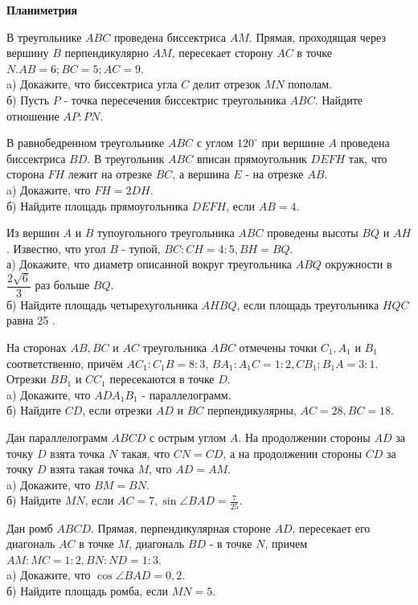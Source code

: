 \centerline{\bf \Huge Планиметрия}

 В треугольнике $A B C$ проведена биссектриса $A M$. Прямая, проходящая через вершину $B$ перпендикулярно $A M$, пересекает сторону $A C$ в точке $N . A B=6 ; B C=5 ; A C=9$.\\
a) Докажите, что биссектриса угла $C$ делит отрезок $M N$ пополам.\\
б) Пусть $P$ - точка пересечения биссектрис треугольника $A B C$. Найдите отношение $A P: P N$.

 В равнобедренном треугольнике $A B C$ с углом $120^{\circ}$ при вершине $A$ проведена биссектриса $B D$. В треугольник $A B C$ вписан прямоугольник $D E F H$ так, что сторона $F H$ лежит на отрезке $B C$, а вершина $E$ - на отрезке $A B$.\\
a) Докажите, что $F H=2 D H$.\\
б) Найдите площадь прямоугольника $D E F H$, если $A B=4$.

 Из вершин $A$ и $B$ тупоугольного треугольника $A B C$ проведены высоты $B Q$ и $A H$. Известно, что угол $B$ - тупой, $B C: C H=4: 5, B H=B Q$.\\
а) Докажите, что диаметр описанной вокруг треугольника $A B Q$ окружности в $\dfrac{2 \sqrt{6}}{3}$ раз больше $B Q$.\\
б) Найдите площадь четырехугольника $A H B Q$, если площадь треугольника $H Q C$ равна 25 .

 На сторонах $A B, B C$ и $A C$ треугольника $A B C$ отмечены точки $C_1, A_1$ и $B_1$ соответственно, причём $A C_1: C_1 B=8: 3$, $B A_1: A_1 C=1: 2, C B_1: B_1 A=3: 1$. Отрезки $B B_1$ и $C C_1$ пересекаются в точке $D$.\\
a) Докажите, что $A D A_1 B_1$ - параллелограмм.\\
б) Найдите $C D$, если отрезки $A D$ и $B C$ перпендикулярны, $A C=28, B C=18$.

 Дан параллелограмм $A B C D$ с острым углом $A$. На продолжении стороны $A D$ за точку $D$ взята точка $N$ такая, что $C N=C D$, а на продолжении стороны $C D$ за точку $D$ взята такая точка $M$, что $A D=A M$.\\
a) Докажите, что $B M=B N$.\\
б) Найдите $M N$, если $A C=7, \sin \angle B A D=\frac{7}{25}$.

 Дан ромб $A B C D$. Прямая, перпендикулярная стороне $A D$, пересекает его диагональ $A C$ в точке $M$, диагональ $B D$ - в точке $N$, причем $A M: M C=1: 2, B N: N D=1: 3$.\\
a) Докажите, что $\cos \angle B A D=0,2$.\\
б) Найдите площадь ромба, если $M N=5$.

